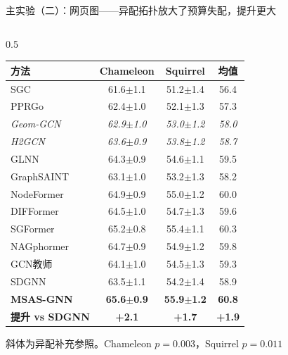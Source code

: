 \documentclass[aspectratio=169,9pt,xcolor=dvipsnames]{beamer}
\newcommand{\green}[1]{\textcolor{mygreen}{#1}}
\begin{document}
\begin{frame}{主实验（二）：网页图——异配拓扑放大了预算失配，提升更大}
\begin{columns}[T]

\begin{column}{0.5\textwidth}
  \begin{tabular}{lccc}
    \toprule
    \textbf{方法} & \textbf{Chameleon} & \textbf{Squirrel} & \textbf{均值} \\
    \midrule
    SGC & 61.6\small{$\pm$1.1} & 51.2\small{$\pm$1.4} & 56.4 \\
    PPRGo & 62.4\small{$\pm$1.0} & 52.1\small{$\pm$1.3} & 57.3 \\
    \textit{Geom-GCN} & \textit{62.9\small{$\pm$1.0}} & \textit{53.0\small{$\pm$1.2}} & \textit{58.0} \\
    \textit{H2GCN} & \textit{63.6\small{$\pm$0.9}} & \textit{53.8\small{$\pm$1.2}} & \textit{58.7} \\
    GLNN & 64.3\small{$\pm$0.9} & 54.6\small{$\pm$1.1} & 59.5 \\
    GraphSAINT & 63.1\small{$\pm$1.0} & 53.2\small{$\pm$1.3} & 58.2 \\
    NodeFormer & 64.9\small{$\pm$0.9} & 55.0\small{$\pm$1.2} & 60.0 \\
    DIFFormer & 64.5\small{$\pm$1.0} & 54.7\small{$\pm$1.3} & 59.6 \\
    SGFormer & 65.2\small{$\pm$0.8} & 55.4\small{$\pm$1.1} & 60.3 \\
    NAGphormer & 64.7\small{$\pm$0.9} & 54.9\small{$\pm$1.2} & 59.8 \\
    \midrule
    GCN教师 & 64.1\small{$\pm$1.0} & 54.5\small{$\pm$1.3} & 59.3 \\
    SDGNN & 63.5\small{$\pm$1.1} & 54.2\small{$\pm$1.4} & 58.9 \\
    \textbf{MSAS-GNN} & \textbf{65.6\small{$\pm$0.9}} & \textbf{55.9\small{$\pm$1.2}} & \textbf{60.8} \\
    \midrule
    \green{\textbf{提升 vs SDGNN}} & \green{\textbf{+2.1}} & \green{\textbf{+1.7}} & \green{\textbf{+1.9}} \\
    \bottomrule
  \end{tabular}

  \medskip
  斜体为异配补充参照。Chameleon $p\!=\!0.003$，Squirrel $p\!=\!0.011$
\end{column}


\end{columns}
\end{frame}
\end{document}

